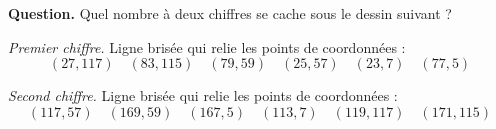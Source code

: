 \documentclass[class=report,crop=false, 12pt]{standalone}
\begin{document}


\begin{enigme}

\textbf{Question.} Quel nombre à deux chiffres se cache sous le dessin suivant ?

\emph{Premier chiffre.} 
Ligne brisée qui relie les points de coordonnées :
$$(27,117) \quad (83,115) \quad (79,59) \quad (25,57) \quad (23,7) \quad (77,5)$$ 


\emph{Second chiffre.}
Ligne brisée qui relie les points de coordonnées :
$$(117,57) \quad (169,59) \quad (167,5) \quad (113,7) \quad (119,117) \quad (171,115)$$ 


\end{enigme}
\end{document}
